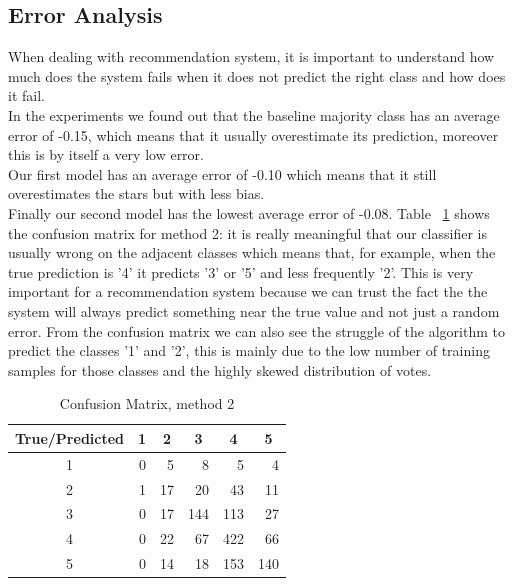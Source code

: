 \documentclass[11pt]{article}
\begin{document}
\subsection{Error Analysis}
When dealing with recommendation system, it is important to understand how much does the system fails when it does not predict the right class and how does it fail.\\
In the experiments we found out that the baseline majority class has an average error of -0.15, which means that it usually overestimate its prediction, moreover this is by itself a very low error.\\
Our first model has an average error of -0.10 which means that it still overestimates the stars but with less bias.\\
Finally our second model has the lowest average error of -0.08.
Table ~\ref{conf} shows the confusion matrix for method 2: it is really meaningful that our classifier is usually wrong on the adjacent classes which means that, for example, when the true prediction is '4' it predicts '3' or '5' and less frequently '2'. This is very important for a recommendation system because we can trust the fact the the system will always predict something near the true value and not just a random error.
From the confusion matrix we can also see the struggle of the algorithm to predict the classes '1' and '2', this is mainly due to the low number of training samples for those classes and the highly skewed distribution of votes.
\begin{table}[]
	\centering
	\caption{Confusion Matrix, method 2}
	\label{conf}
	\begin{tabular}{|c|r|r|r|r|r|}
		\hline
		True/Predicted & \multicolumn{1}{c|}{1} & \multicolumn{1}{c|}{2} & \multicolumn{1}{c|}{3} & \multicolumn{1}{c|}{4} & \multicolumn{1}{c|}{5} \\ \hline
		1              & 0                      & 5                      & 8                      & 5                      & 4                      \\ \hline
		2              & 1                      & 17                     & 20                     & 43                     & 11                     \\ \hline
		3              & 0                      & 17                     & 144                    & 113                    & 27                     \\ \hline
		4              & 0                      & 22                     & 67                     & 422                    & 66                     \\ \hline
		5              & 0                      & 14                     & 18                     & 153                    & 140                    \\ \hline
	\end{tabular}
\end{table}
\end{document}
